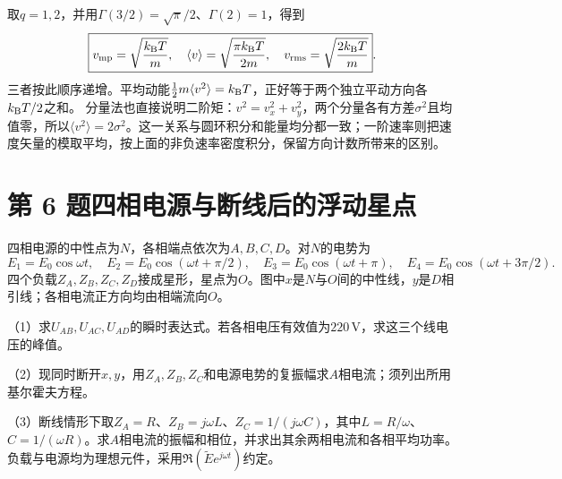 \documentclass[UTF8,fontset=fandol,a4paper,11pt]{ctexart}
\newcommand{\figcaption}[1]{\par\vspace{2pt}{\small\color{muted}#1}\par}
\begin{document}
取$q=1,2$，并用$\Gamma(3/2)=\sqrt\pi/2$、$\Gamma(2)=1$，得到
\[
\boxed{v_{\rm mp}=\sqrt{\frac{k_{\rm B}T}{m}},\quad
\langle v\rangle=\sqrt{\frac{\pi k_{\rm B}T}{2m}},\quad
v_{\rm rms}=\sqrt{\frac{2k_{\rm B}T}{m}}}.
\]
三者按此顺序递增。平均动能$\frac12m\langle v^2\rangle=k_{\rm B}T$，正好等于两个独立平动方向各$k_{\rm B}T/2$之和。
分量法也直接说明二阶矩：$v^2=v_x^2+v_y^2$，两个分量各有方差$\sigma^2$且均值零，所以$\langle v^2\rangle=2\sigma^2$。这一关系与圆环积分和能量均分都一致；一阶速率则把速度矢量的模取平均，按上面的非负速率密度积分，保留方向计数所带来的区别。





\section*{第 6 题\quad 四相电源与断线后的浮动星点}\label{q:6}


四相电源的中性点为$N$，各相端点依次为$A,B,C,D$。对$N$的电势为
\[
E_1=E_0\cos\omega t,\quad E_2=E_0\cos(\omega t+\pi/2),\quad
E_3=E_0\cos(\omega t+\pi),\quad E_4=E_0\cos(\omega t+3\pi/2).
\]
四个负载$Z_A,Z_B,Z_C,Z_D$接成星形，星点为$O$。图中$x$是$N$与$O$间的中性线，$y$是$D$相引线；各相电流正方向均由相端流向$O$。

（1）求$U_{AB},U_{AC},U_{AD}$的瞬时表达式。若各相电压有效值为$220\,\mathrm V$，求这三个线电压的峰值。

（2）现同时断开$x,y$，用$Z_A,Z_B,Z_C$和电源电势的复振幅求$A$相电流；须列出所用基尔霍夫方程。

（3）断线情形下取$Z_A=R$、$Z_B=j\omega L$、$Z_C=1/(j\omega C)$，其中$L=R/\omega$、$C=1/(\omega R)$。求$A$相电流的振幅和相位，并求出其余两相电流和各相平均功率。负载与电源均为理想元件，采用$\Re(\widetilde E e^{j\omega t})$约定。


\begin{center}\begin{minipage}{.98\linewidth}\centering
{}
\figcaption{图综三.6\quad 四相星形负载；$x$为中性线，$y$为$D$相引线。}
\end{minipage}\end{center}
\end{document}
